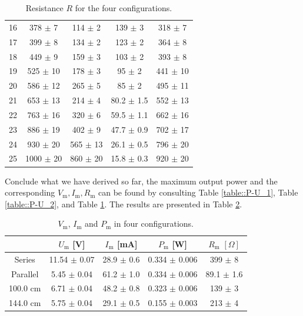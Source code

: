 \documentclass[a4paper]{article}
\begin{document}
\begin{table}[H]
\begin{tabular}{c|cccc}
		16 & 378 $\pm$ 7                                  & 114 $\pm$ 2     & 139 $\pm$ 3    & 318 $\pm$ 7    \\
		17 & 399 $\pm$ 8                                  & 134 $\pm$ 2     & 123 $\pm$ 2    & 364 $\pm$ 8    \\
		18 & 449 $\pm$ 9                                  & 159 $\pm$ 3     & 103 $\pm$ 2    & 393 $\pm$ 8    \\
		19 & 525 $\pm$ 10                                 & 178 $\pm$ 3     & 95 $\pm$ 2     & 441 $\pm$ 10   \\
		20 & 586 $\pm$ 12                                 & 265 $\pm$ 5     & 85 $\pm$ 2     & 495 $\pm$ 11   \\
		21 & 653 $\pm$ 13                                 & 214 $\pm$ 4     & 80.2 $\pm$ 1.5 & 552 $\pm$ 13   \\
		22 & 763 $\pm$ 16                                 & 320 $\pm$ 6     & 59.5 $\pm$ 1.1 & 662 $\pm$ 16   \\
		23 & 886 $\pm$ 19                                 & 402 $\pm$ 9     & 47.7 $\pm$ 0.9 & 702 $\pm$ 17   \\
		24 & 930 $\pm$ 20                                 & 565 $\pm$ 13    & 26.1 $\pm$ 0.5 & 796 $\pm$ 20   \\
		25 & 1000 $\pm$ 20                                & 860 $\pm$ 20    & 15.8 $\pm$ 0.3 & 920 $\pm$ 20   \\
		\hline
	\end{tabular}
	\caption{Resistance $R$ for the four configurations.}
	\label{table::R}
\end{table}

Conclude what we have derived so far, the maximum output power and the corresponding $V_\text{m}, I_\text{m}, R_\text{m}$ can be found by consulting Table \ref{table::P-U_1}, Table \ref{table::P-U_2}, and Table \ref{table::R}.
The results are presented in Table \ref{table::Pmax}.

\begin{table}[H]
	\centering
	\begin{tabular}{ccccc}
		\hline
		         & $U_\text{m}$ [V] & $I_\text{m}$ [mA] & $P_\text{m}$ [W]   & $R_\text{m}\,\,[\Omega]$ \\
		\hline
		Series   & 11.54 $\pm$ 0.07 & 28.9 $\pm$ 0.6    & 0.334  $\pm$ 0.006 & 399   $\pm$ 8            \\
		Parallel & 5.45  $\pm$ 0.04 & 61.2 $\pm$ 1.0    & 0.334  $\pm$ 0.006 & 89.1 $\pm$ 1.6           \\
		100.0 cm & 6.71  $\pm$ 0.04 & 48.2 $\pm$ 0.8    & 0.323  $\pm$ 0.006 & 139   $\pm$ 3            \\
		144.0 cm & 5.75  $\pm$ 0.04 & 29.1 $\pm$ 0.5    & 0.155  $\pm$ 0.003 & 213   $\pm$ 4            \\
		\hline
	\end{tabular}
	\caption{$V_\text{m}$, $I_\text{m}$ and $P_\text{m}$ in four configurations.}
	\label{table::Pmax}
\end{table}
\end{document}
